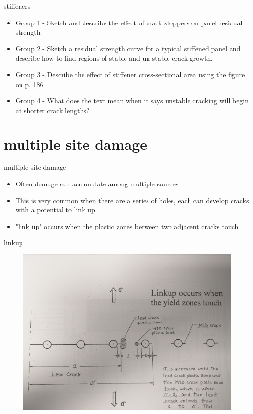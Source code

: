\documentclass[10pt]{beamer}
\begin{document}
\begin{frame}{stiffeners}
	\begin{itemize}
		\item Group 1 - Sketch and describe the effect of crack stoppers on panel residual strength
		\item Group 2 - Sketch a residual strength curve for a typical stiffened panel and describe how to find regions of stable and un-stable crack growth.
		\item Group 3 - Describe the effect of stiffener cross-sectional area using the figure on p. 186
		\item Group 4 - What does the text mean when it says unstable cracking will begin at shorter crack lengths?
	\end{itemize}
\end{frame}

\section{multiple site damage}

\begin{frame}{multiple site damage}
	\begin{itemize}[<+->]
		\item Often damage can accumulate among multiple sources
		\item This is very common when there are a series of holes, each can develop cracks with a potential to link up
		\item "link up" occurs when the plastic zones between two adjacent cracks touch
	\end{itemize}
\end{frame}

\begin{frame}{linkup}
\begin{figure}
\centering
\includegraphics[width=0.7\linewidth]{msd}
\label{fig:msd}
\end{figure}
\end{frame}
\end{document}
